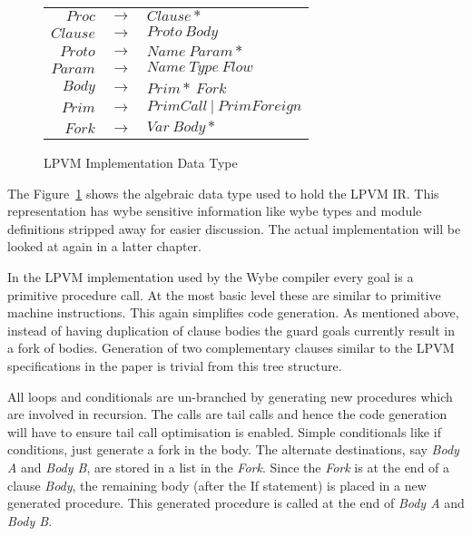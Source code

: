 \begin{figure}
\centering
\begin{tabular}{r c l}
\( Proc \)   & \( \rightarrow \) & \( Clause* \) \\
\( Clause \) & \( \rightarrow \) & \( Proto\ Body \) \\
\( Proto \)  & \( \rightarrow \) & \( Name\ Param* \) \\
\( Param \)  & \( \rightarrow \) & \( Name\ Type\ Flow \) \\
\( Body \)   & \( \rightarrow \) & \( Prim*\ Fork \) \\
\( Prim \)   & \( \rightarrow \) & \( PrimCall\ |\ PrimForeign \) \\
\( Fork \)   & \( \rightarrow \) & \( Var\ Body* \) \\
\end{tabular}
\caption{LPVM Implementation Data Type}
\label{fig:lpvm_data_type}
\end{figure}

The Figure~\ref{fig:lpvm_data_type} shows the algebraic data type used to hold
the LPVM IR. This representation has wybe sensitive information like wybe types
and module definitions stripped away for easier discussion. The actual
implementation will be looked at again in a latter chapter.


In the LPVM implementation used by the Wybe compiler every goal is a primitive
procedure call. At the most basic level these are similar to primitive machine
instructions. This again simplifies code generation. As mentioned above,
instead of having duplication of clause bodies the guard goals currently result
in a fork of bodies. Generation of two complementary clauses similar to the
LPVM specifications in the paper is trivial from this tree structure.


All loops and conditionals are un-branched by generating new procedures which
are involved in recursion. The calls are tail calls and hence the code
generation will have to ensure tail call optimisation is enabled. Simple
conditionals like if conditions, just generate a fork in the body. The
alternate destinations, say \textit{Body A} and \textit{Body B}, are stored in a
list in the \textit{Fork}. Since the \textit{Fork} is at the end of a clause
\textit{Body}, the remaining body (after the If statement) is placed in a new
generated procedure. This generated procedure is called at the end of
\textit{Body A} and \textit{Body B}.


